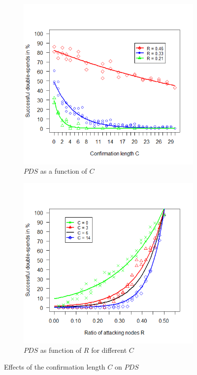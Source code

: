 \documentclass[a4paper,12pt,twoside]{report}
\begin{document}
\begin{figure}[h!]
\centering
\begin{subfigure}{.5\textwidth}
  \centering
  \includegraphics[width=\linewidth]{Experiments/Confirmations/conf.png}
  \caption{$PDS$ as a function of $C$}
  \label{conf:a}
\end{subfigure}%
\begin{subfigure}{.5\textwidth}
  \centering
  \includegraphics[width=\linewidth]{Experiments/Confirmations/confrat.png}
  \caption{$PDS$ as function of $R$ for different $C$}
  \label{conf:b}
\end{subfigure}
\caption{Effects of the confirmation length $C$ on $PDS$}
\label{conf}
\end{figure}
\end{document}
